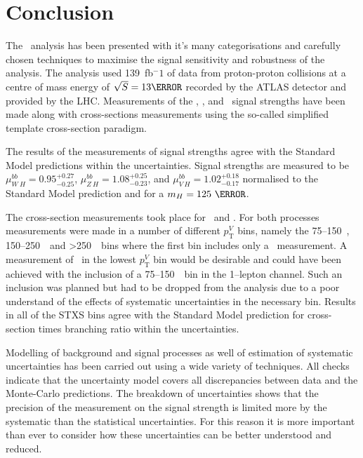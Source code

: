 \chapter{Conclusion}%
\label{ch:conclusion}
The \VHbb\ analysis has been presented with it's many categorisations and
carefully chosen techniques to maximise the signal sensitivity and robustness of
the analysis. The analysis used 139~fb$^-1$ of data from proton-proton
collisions at a centre of mass energy of $\sqrt{S} = 13 \TeV$ recorded by the
ATLAS detector and provided by the LHC. Measurements of the \WH, \ZH, and \VH\
signal strengths have been made along with cross-sections measurements using the
so-called simplified template cross-section paradigm. 

The results of the measurements of signal strengths agree with the Standard
Model predictions within the uncertainties. Signal strengths are measured to be
$\mu_{W\:H}^{bb} = 0.95^{+0.27}_{-0.25}$, $\mu_{Z\:H}^{bb} =
1.08^{+0.25}_{-0.23}$, and $\mu_{V\:H}^{bb} = 1.02^{+0.18}_{-0.17}$ normalised
to the Standard Model prediction and for a $m_H = 125~\GeV$.

The cross-section measurements took place for \WH\ and \ZH. For both processes
measurements were made in a number of different $p_{\mathrm{T}}^{V}$ bins,
namely the 75--150~\GeV, 150--250~\GeV\ and >250~\GeV\ bins where the first bin
includes only a \ZH\ measurement. A measurement of \WH\ in the lowest
$p_{\mathrm{T}}^{V}$ bin would be desirable and could have been achieved with
the inclusion of a 75--150~\GeV\ bin in the 1--lepton channel. Such an inclusion
was planned but had to be dropped from the analysis due to a poor understand of
the effects of systematic uncertainties in the necessary bin. Results in all of
the STXS bins agree with the Standard Model prediction for cross-section times
branching ratio within the uncertainties.

Modelling of background and signal processes as well of estimation of systematic
uncertainties has been carried out using a wide variety of techniques. All
checks indicate that the uncertainty model covers all discrepancies between data
and the Monte-Carlo predictions. The breakdown of uncertainties shows that the
precision of the measurement on the signal strength is limited more by the
systematic than the statistical uncertainties. For this reason it is more
important than ever to consider how these uncertainties can be better understood
and reduced. 

